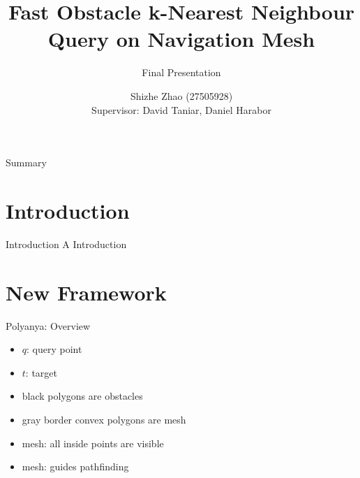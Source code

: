 \documentclass{beamer}
\title[Fast Obstacle k-Nearest Neighbour Query on Navigation Mesh]{
    Fast Obstacle k-Nearest Neighbour Query on Navigation Mesh \\
}
\subtitle {Final Presentation}
\date{}
\author[Shizhe Zhao]{
    Shizhe Zhao (27505928)\\
    Supervisor: David Taniar, Daniel Harabor
}
\begin{document}

\frame{\titlepage}
\section[]{}
\begin{frame}{Summary}
  \tableofcontents
\end{frame}

\section{Introduction}
\begin{frame}{Introduction}
A Introduction
\end{frame}

\section{New Framework}
\begin{frame}{Polyanya: Overview}

\begin{minipage}{.4\textwidth}
\begin{itemize}
    \item \small $q$: query point
    \item \small $t$: target
    \item \small black polygons are obstacles
    \item \small gray border convex polygons are mesh
    \item \small mesh: all inside points are visible
    \item \small mesh: guides pathfinding
\end{itemize}

\end{minipage}%
\begin{minipage}{.6\textwidth}
\begin{adjustbox}{max totalsize={.9\textwidth}{.9\textheight}, right}
\begin{tikzpicture}
    
\end{tikzpicture}
\end{adjustbox}
\end{minipage}

\end{frame}
\end{document}
